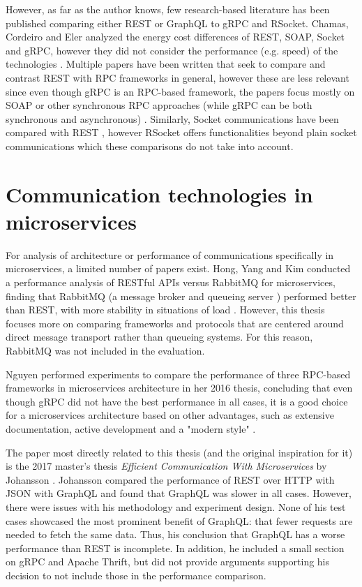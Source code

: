 However, as far as the author knows, few research-based literature has been published comparing either REST or GraphQL to gRPC and RSocket. Chamas, Cordeiro and Eler analyzed the energy cost differences of REST, SOAP, Socket and gRPC, however they did not consider the performance (e.g. speed) of the technologies \cite{chamas2017comparing}. Multiple papers have been written that seek to compare and contrast REST with RPC frameworks in general, however these are less relevant since even though gRPC is an RPC-based framework, the papers focus mostly on SOAP or other synchronous RPC approaches (while gRPC can be both synchronous and asynchronous) \cite{mironela2009importance,feng2009rest,aboutgrpc,vinoski2008rpc,kennedy2009framework}. Similarly, Socket communications have been compared with REST \cite{choi2012performance,cho2014replacing}, however RSocket offers functionalities beyond plain socket communications which these comparisons do not take into account.

\section{Communication technologies in microservices}
For analysis of architecture or performance of communications specifically in microservices, a limited number of papers exist. Hong, Yang and Kim conducted a performance analysis of RESTful APIs versus RabbitMQ for microservices, finding that RabbitMQ (a message broker and queueing server \cite{rostanski2014evaluation}) performed better than REST, with more stability in situations of load \cite{hong2018performance}. However, this thesis focuses more on comparing frameworks and protocols that are centered around direct message transport rather than queueing systems. For this reason, RabbitMQ was not included in the evaluation. 

Nguyen performed experiments to compare the performance of three RPC-based frameworks in microservices architecture in her 2016 thesis, concluding that even though gRPC did not have the best performance in all cases, it is a good choice for a microservices architecture based on other advantages, such as extensive documentation, active development and a "modern style" \cite{nguyen2016benchmarking}.

The paper most directly related to this thesis (and the original inspiration for it) is the 2017 master's thesis \textit{Efficient Communication With Microservices} by Johansson \cite{johansson2017efficient}. Johansson compared the performance of REST over HTTP with JSON with GraphQL and found that GraphQL was slower in all cases. However, there were issues with his methodology and experiment design. None of his test cases showcased the most prominent benefit of GraphQL: that fewer requests are needed to fetch the same data. Thus, his conclusion that GraphQL has a worse performance than REST is incomplete. In addition, he included a small section on gRPC and Apache Thrift, but did not provide arguments supporting his decision to not include those in the performance comparison.